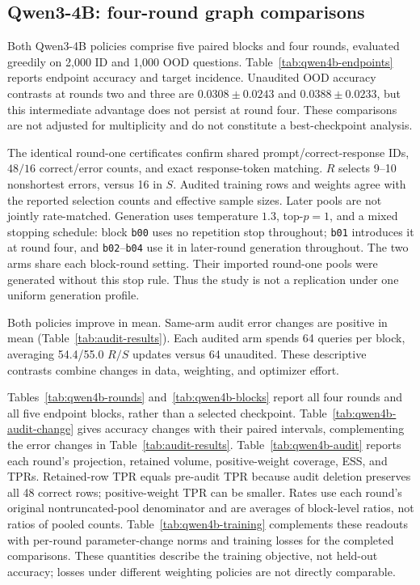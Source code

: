 \subsection{Qwen3-4B: four-round graph comparisons}
\label{app:qwen4b-four-round}

Both Qwen3-4B policies comprise five paired blocks and four rounds,
evaluated greedily on 2,000 ID and 1,000 OOD questions.
Table~\ref{tab:qwen4b-endpoints} reports endpoint accuracy and target incidence.
Unaudited OOD accuracy contrasts
at rounds two and three are $0.0308\pm0.0243$ and $0.0388\pm0.0233$,
but this intermediate advantage does not persist at round four.
These comparisons are not adjusted for multiplicity and do not constitute
a best-checkpoint analysis.




The identical round-one certificates confirm shared prompt/correct-response IDs,
$48/16$ correct/error counts, and exact response-token matching.
$R$ selects 9--10 nonshortest errors, versus 16 in $S$.
Audited training rows and weights agree with the reported
selection counts and effective sample sizes. Later pools are not jointly rate-matched.
Generation uses temperature $1.3$, top-$p=1$, and a mixed stopping schedule: block
\texttt{b00} uses no repetition stop throughout; \texttt{b01} introduces
it at round four, and \texttt{b02}--\texttt{b04} use it in later-round
generation throughout. The two arms share each block-round setting.
Their imported round-one pools were generated without this stop rule.
Thus the study is not a replication under one uniform generation profile.

Both policies improve in mean.
Same-arm audit error changes are positive in mean
(Table~\ref{tab:audit-results}). Each audited arm spends 64
queries per block, averaging 54.4/55.0 $R/S$ updates versus 64 unaudited.
These descriptive contrasts combine changes in data, weighting,
and optimizer effort.

Tables~\ref{tab:qwen4b-rounds} and~\ref{tab:qwen4b-blocks} report all four
rounds and all five endpoint blocks, rather than a selected checkpoint.
Table~\ref{tab:qwen4b-audit-change} gives accuracy changes with their
paired intervals, complementing the error changes in
Table~\ref{tab:audit-results}. Table~\ref{tab:qwen4b-audit} reports each
round's projection, retained volume, positive-weight coverage, ESS, and
TPRs. Retained-row TPR equals pre-audit TPR because audit deletion
preserves all 48 correct rows; positive-weight TPR can be smaller.
Rates use each round's original nontruncated-pool denominator and are
averages of block-level ratios, not ratios of pooled counts.
Table~\ref{tab:qwen4b-training} complements these readouts with per-round
parameter-change norms and training losses for the completed comparisons.
These quantities describe the training objective, not held-out accuracy;
losses under different weighting policies are not directly comparable.

